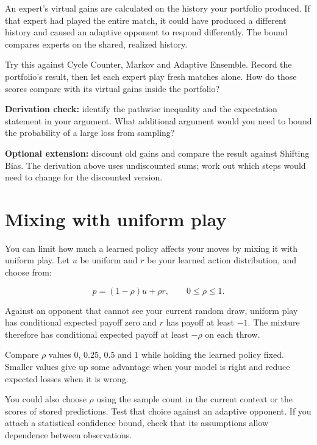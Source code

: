 \documentclass[11pt]{article}
\begin{document}
An expert's virtual gains are calculated on the history your portfolio produced. If that expert had played the entire match, it could have produced a different history and caused an adaptive opponent to respond differently. The bound compares experts on the shared, realized history.


Try this against Cycle Counter, Markov and Adaptive Ensemble. Record the portfolio's result, then let each expert play fresh matches alone. How do those scores compare with its virtual gains inside the portfolio?


\begin{checkpoint}
\textbf{Derivation check:} identify the pathwise inequality and the expectation statement in your argument. What additional argument would you need to bound the probability of a large loss from sampling?
\end{checkpoint}

\textbf{Optional extension:} discount old gains and compare the result against Shifting Bias. The derivation above uses undiscounted sums; work out which steps would need to change for the discounted version.
\par
\clearpage
\section*{Mixing with uniform play}

\begin{context}
You can limit how much a learned policy affects your moves by mixing it with uniform play. Let $u$ be uniform and $r$ be your learned action distribution, and choose from:

\end{context}

\[
p=(1-\rho)u+\rho r, \qquad 0\leq\rho\leq1.
\]

Against an opponent that cannot see your current random draw, uniform play has conditional expected payoff zero and $r$ has payoff at least $-1$. The mixture therefore has conditional expected payoff at least $-\rho$ on each throw.



Compare $\rho$ values $0$, $0.25$, $0.5$ and $1$ while holding the learned policy fixed. Smaller values give up some advantage when your model is right and reduce expected losses when it is wrong.


You could also choose $\rho$ using the sample count in the current context or the scores of stored predictions. Test that choice against an adaptive opponent. If you attach a statistical confidence bound, check that its assumptions allow dependence between observations.
\end{document}
